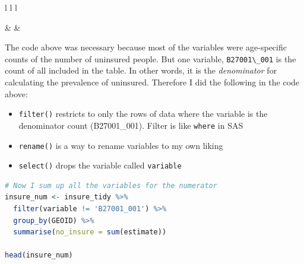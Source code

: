 \documentclass[
]{book}
\newcommand{\passthrough}[1]{#1}
\providecommand{\tightlist}{%
  \setlength{\itemsep}{0pt}\setlength{\parskip}{0pt}}
\begin{document}
\begin{table}[ht]
\begin{centerbox}
\begin{threeparttable}
\begin{tabular}{l l l}

 &
 &
 \tabularnewline[-0.5pt]


\end{tabular}
\end{threeparttable}\par\end{centerbox}

\end{table}
 

The code above was necessary because most of the variables were age-specific counts of the number of uninsured people. But one variable, \passthrough{\lstinline!B27001\_001!} is the count of all included in the table. In other words, it is the \emph{denominator} for calculating the prevalence of uninsured. Therefore I did the following in the code above:

\begin{itemize}
\tightlist
\item
  \passthrough{\lstinline!filter()!} restricts to only the rows of data where the variable is the denominator count (B27001\_001). Filter is like \passthrough{\lstinline!where!} in SAS
\item
  \passthrough{\lstinline!rename()!} is a way to rename variables to my own liking
\item
  \passthrough{\lstinline!select()!} drops the variable called \passthrough{\lstinline!variable!}
\end{itemize}

\begin{lstlisting}[language=R]
# Now I sum up all the variables for the numerator
insure_num <- insure_tidy %>%
  filter(variable != 'B27001_001') %>%
  group_by(GEOID) %>%
  summarise(no_insure = sum(estimate))

head(insure_num)
\end{lstlisting}
\end{document}
